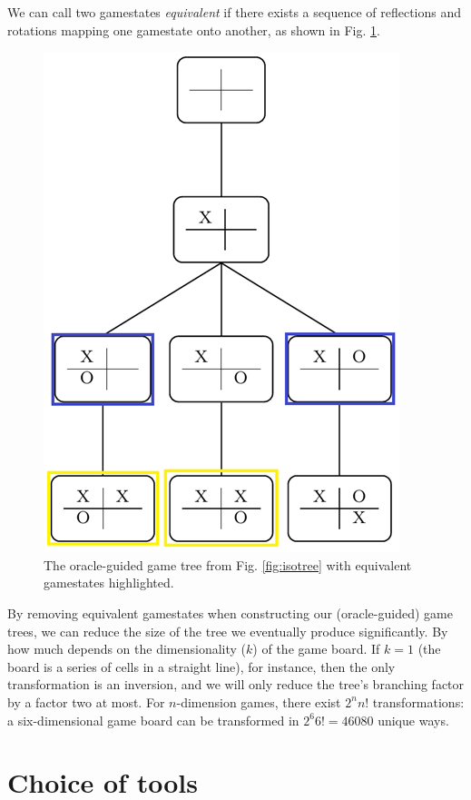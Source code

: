 \documentclass[english, 11pt]{article}
\begin{document}
We can call two gamestates \textit{equivalent} if there exists a sequence of reflections and rotations mapping one gamestate onto another, as shown in Fig. \ref{fig:equivtree}. 

\begin{figure}[!h]
	\centering
	\includegraphics[scale=.65]{./img/equivtree.png}
	\caption{The oracle-guided game tree from Fig. \ref{fig:isotree} with equivalent gamestates highlighted.} \label{fig:equivtree}
\end{figure}

By removing equivalent gamestates when constructing our (oracle-guided) game trees, we can reduce the size of the tree we eventually produce significantly. By how much depends on the dimensionality ($k$) of the game board. If $k=1$ (the board is a series of cells in a straight line), for instance, then the only transformation is an inversion, and we will only reduce the tree's branching factor by a factor two at most. For $n$-dimension games, there exist $2^nn!$ transformations: a six-dimensional game board can be transformed in $2^6 6!=46080$ unique ways.

\section*{Choice of tools}
\end{document}
